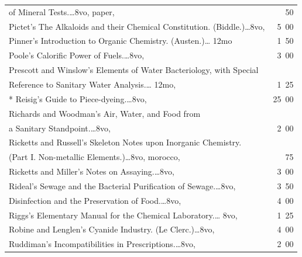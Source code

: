\documentclass[a4paper,12pt]{book}[2004/02/16]
\theoremstyle{ilemma}
\theoremstyle{itheorem}
\theoremstyle{iother}
\theoremstyle{icorollary}
\theoremstyle{numcorollary}
\theoremstyle{idefinition}
\begin{document}
\begin{longtable}{@{}l@{ }r@{}}
\nopagebreak
\indent\indent of Mineral Tests.\dotfill\ldots 8vo, paper, &50\\

Pictet's The Alkaloids and their Chemical
Constitution. (Biddle.)\dotfill\ldots 8vo, &5\ 00\\

Pinner's Introduction to Organic Chemistry. (Austen.)\dotfill\ldots
12mo &1\ 50\\

Poole's Calorific Power of Fuels.\dotfill\ldots 8vo, &3\ 00\\

Prescott and Winslow's Elements of Water Bacteriology, with Special \\

\nopagebreak
\indent\indent Reference to Sanitary Water Analysis.\dotfill\ldots
12mo, &1\ 25\\

* Reisig's Guide to Piece-dyeing.\dotfill\ldots 8vo, &25\ 00\\

Richards and Woodman's Air, Water, and Food from\\

\nopagebreak
\indent\indent a Sanitary Standpoint.\dotfill\ldots 8vo, &2\ 00\\

Ricketts and Russell's Skeleton Notes upon Inorganic Chemistry.\\

\nopagebreak
\indent\indent (Part I\@. Non-metallic Elements.)\dotfill\ldots 8vo,
morocco, &75\\

Ricketts and Miller's Notes on Assaying.\dotfill\ldots 8vo, &3\ 00\\

Rideal's Sewage and the Bacterial Purification of
Sewage.\dotfill\ldots 8vo, &3\ 50\\

\nopagebreak
\indent Disinfection and the Preservation of Food.\dotfill\ldots 8vo,
&4\ 00\\

Riggs's Elementary Manual for the Chemical Laboratory.\dotfill\ldots
8vo, &1\ 25\\

Robine and Lenglen's Cyanide Industry. (Le Clerc.)\dotfill\ldots 8vo,
&4\ 00\\

Ruddiman's Incompatibilities in Prescriptions.\dotfill\ldots 8vo, &2\ 00\\


\end{longtable}
\end{document}
